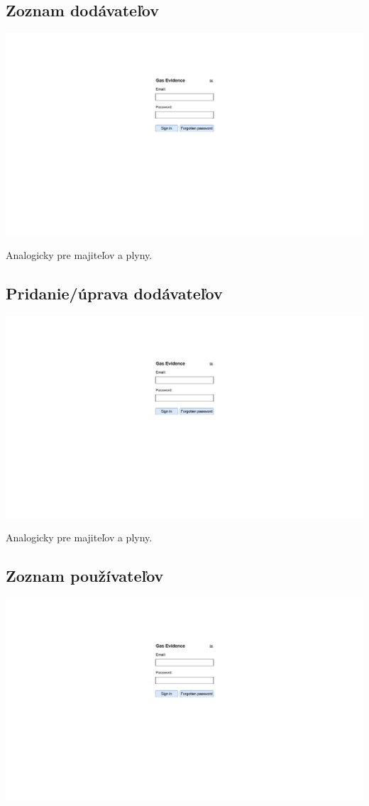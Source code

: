 \documentclass{zah}
\begin{document}
\subsection{Zoznam dodávateľov}
\begin{center}
\includegraphics[width=.7\textwidth,page=7]{navrh-assets/ui}
\end{center}
Analogicky pre majiteľov a plyny.

\subsection{Pridanie/úprava dodávateľov}
\begin{center}
\includegraphics[width=.7\textwidth,page=8]{navrh-assets/ui}
\end{center}
Analogicky pre majiteľov a plyny.

\subsection{Zoznam používateľov}
\begin{center}
\includegraphics[width=.7\textwidth,page=9]{navrh-assets/ui}
\end{center}
\end{document}
